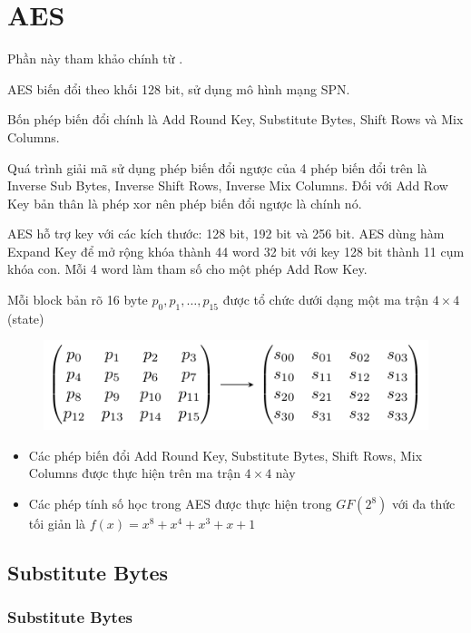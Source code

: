\chapter{AES}

Phần này tham khảo chính từ \cite{Stallings}.

AES biến đổi theo khối 128 bit, sử dụng mô hình mạng SPN.

Bốn phép biến đổi chính là Add Round Key, Substitute Bytes, Shift Rows và Mix Columns.

Quá trình giải mã sử dụng phép biến đổi ngược của 4 phép biến đổi trên là Inverse Sub Bytes, Inverse Shift Rows, Inverse Mix Columns. Đối với Add Row Key bản thân là phép xor nên phép biến đổi ngược là chính nó.

AES hỗ trợ key với các kích thước: 128 bit, 192 bit và 256 bit. AES dùng hàm Expand Key để mở rộng khóa thành 44 word 32 bit với key 128 bit thành 11 cụm khóa con. Mỗi 4 word làm tham số cho một phép Add Row Key.

Mỗi block bản rõ 16 byte $p_0, p_1, \ldots, p_{15}$ được tổ chức dưới dạng một ma trận $4 \times 4$ (state)

\begin{figure}[ht]
    \centering
    \includegraphics{../pics/aes/state.pdf}
\end{figure}    

\begin{itemize}
    \item Các phép biến đổi Add Round Key, Substitute Bytes, Shift Rows, Mix Columns được thực hiện trên ma trận $4 \times 4$ này
    \item Các phép tính số học trong AES được thực hiện trong $GF(2^8)$ với đa thức tối giản là $f(x) = x^8 + x^4 + x^3 + x + 1$
\end{itemize}

\section{Substitute Bytes}

\subsection{Substitute Bytes}

